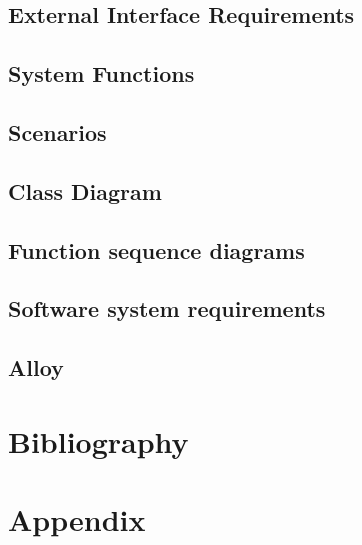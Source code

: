\documentclass[12pt, a4paper]{article}
\begin{document}
    	\subsection{External Interface Requirements}
    	
    	
    	\subsection{System Functions}
    	
    	
    	\subsection{Scenarios}
    	
    	
    	\newpage
    	\subsection{Class Diagram}
    	
    	
    	\newpage
    	\subsection{Function sequence diagrams}
    	
    	
    	\subsection{Software system requirements}
    	
    	
    	\subsection{Alloy}
    	
    
    \newpage
    \section{Bibliography}
        
    
    \newpage
    \section{Appendix}
        
    
\end{document}
